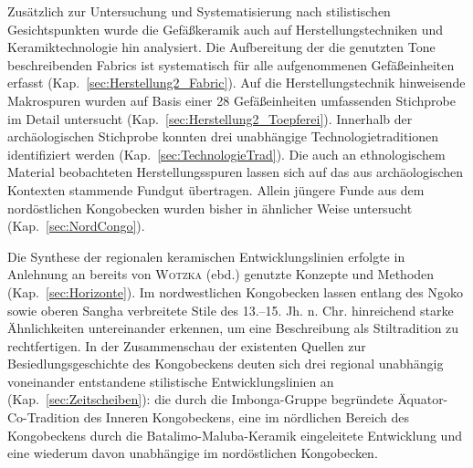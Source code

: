 \begin{multicols}{2}
Zusätzlich zur Untersuchung und Systematisierung nach stilistischen Gesichtspunkten wurde die Gefäßkeramik auch auf Herstellungstechniken und Keramiktechnologie hin analysiert. Die Aufbereitung der die genutzten Tone beschreibenden Fabrics ist systematisch für alle aufgenommenen Gefäßeinheiten erfasst (Kap.~\ref{sec:Herstellung2_Fabric}). Auf die Herstellungstechnik hinweisende Makrospuren wurden auf Basis einer 28 Gefäßeinheiten umfassenden Stichprobe im Detail untersucht (Kap.~\ref{sec:Herstellung2_Toepferei}). Innerhalb der archäologischen Stichprobe konnten drei unabhängige Technologietraditionen identifiziert werden (Kap.~\ref{sec:TechnologieTrad}). Die auch an ethnologischem Material beobachteten Herstellungsspuren  lassen sich auf das aus archäologischen Kontexten stammende Fundgut übertragen. Allein jüngere Funde aus dem nordöstlichen Kongobecken wurden bisher in ähnlicher Weise untersucht (Kap.~\ref{sec:NordCongo}). 

Die Synthese der regionalen keramischen Entwicklungslinien erfolgte in Anlehnung an bereits von \textsc{Wotzka} (ebd.) genutzte Konzepte und Methoden (Kap.~\ref{sec:Horizonte}). Im nordwestlichen Kongobecken lassen entlang des Ngoko sowie oberen Sangha verbreitete Stile des 13.–15. Jh. n. Chr. hinreichend starke Ähnlichkeiten untereinander erkennen, um eine Beschreibung als Stiltradition zu rechtfertigen. In der Zusammenschau der existenten Quellen zur Besiedlungsgeschichte des Kongobeckens deuten sich drei regional unabhängig voneinander entstandene stilistische Entwicklungslinien an (Kap.~\ref{sec:Zeitscheiben}): die durch die Imbonga-Gruppe begründete Äquator-Co-Tradition des Inneren Kongobeckens,  eine im nördlichen Bereich des Kongobeckens durch die Batalimo-Maluba-Keramik eingeleitete Entwicklung und eine wiederum davon unabhängige im nordöstlichen Kongobecken.


\end{multicols}
